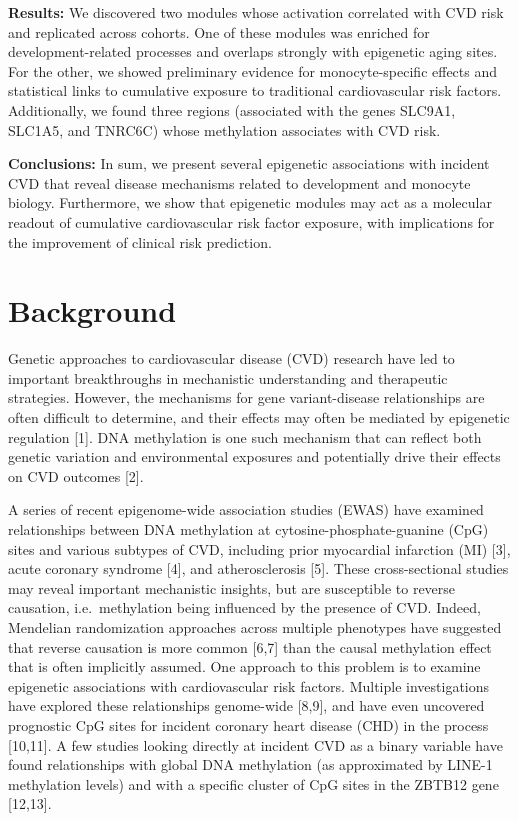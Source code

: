 \documentclass[]{bmcart}
\begin{document}
\textbf{Results:} We discovered two modules whose activation correlated
with CVD risk and replicated across cohorts. One of these modules was
enriched for development-related processes and overlaps strongly with
epigenetic aging sites. For the other, we showed preliminary evidence
for monocyte-specific effects and statistical links to cumulative
exposure to traditional cardiovascular risk factors. Additionally, we
found three regions (associated with the genes SLC9A1, SLC1A5, and
TNRC6C) whose methylation associates with CVD risk.

\textbf{Conclusions:} In sum, we present several epigenetic associations
with incident CVD that reveal disease mechanisms related to development
and monocyte biology. Furthermore, we show that epigenetic modules may
act as a molecular readout of cumulative cardiovascular risk factor
exposure, with implications for the improvement of clinical risk
prediction.

\section{Background}\label{background}

Genetic approaches to cardiovascular disease (CVD) research have led to
important breakthroughs in mechanistic understanding and therapeutic
strategies. However, the mechanisms for gene variant-disease
relationships are often difficult to determine, and their effects may
often be mediated by epigenetic regulation {[}1{]}. DNA methylation is
one such mechanism that can reflect both genetic variation and
environmental exposures and potentially drive their effects on CVD
outcomes {[}2{]}.

A series of recent epigenome-wide association studies (EWAS) have
examined relationships between DNA methylation at
cytosine-phosphate-guanine (CpG) sites and various subtypes of CVD,
including prior myocardial infarction (MI) {[}3{]}, acute coronary
syndrome {[}4{]}, and atherosclerosis {[}5{]}. These cross-sectional
studies may reveal important mechanistic insights, but are susceptible
to reverse causation, i.e.~methylation being influenced by the presence
of CVD. Indeed, Mendelian randomization approaches across multiple
phenotypes have suggested that reverse causation is more common
{[}6,7{]} than the causal methylation effect that is often implicitly
assumed. One approach to this problem is to examine epigenetic
associations with cardiovascular risk factors. Multiple investigations
have explored these relationships genome-wide {[}8,9{]}, and have even
uncovered prognostic CpG sites for incident coronary heart disease (CHD)
in the process {[}10,11{]}. A few studies looking directly at incident
CVD as a binary variable have found relationships with global DNA
methylation (as approximated by LINE-1 methylation levels) and with a
specific cluster of CpG sites in the ZBTB12 gene {[}12,13{]}.
\end{document}
